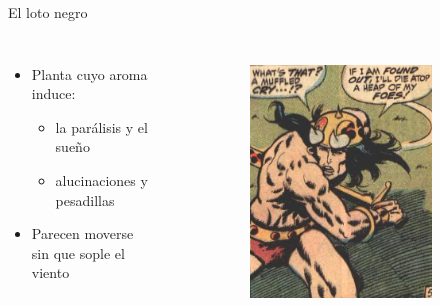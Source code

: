 \begin{frame}{El loto negro}
	\begin{columns}
		\begin{itemize}
			\item Planta cuyo aroma induce:
			\begin{itemize}
				\item la parálisis y el sueño
				\item alucinaciones y pesadillas
			\end{itemize}
			\item Parecen moverse sin que sople el viento
		\end{itemize}
		\begin{figure}[htp]
			\centering
			\begin{subfigure}[b]{0.3\textwidth}
				\includegraphics[width=\textwidth]{img/conan/CTB}
			\end{subfigure}
			~
			\begin{subfigure}[b]{0.27\textwidth}

\end{subfigure}
\end{figure}
\end{columns}
\end{frame}
